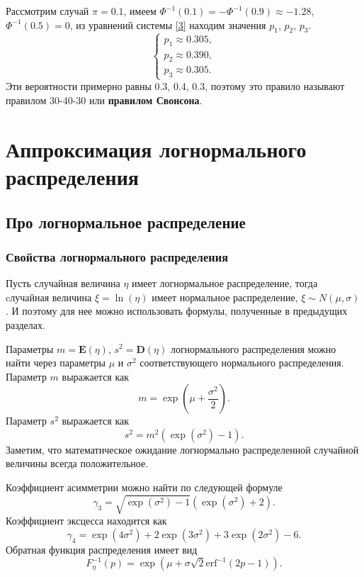 \documentclass[specialist, substylefile = spbu.rtx,
subf,href,colorlinks=true, 12pt]{disser}
\begin{document}
Рассмотрим случай $\pi = 0.1$, имеем $\Phi ^{-1}(0.1) = -\Phi ^{-1}(0.9) \approx  -1.28$, $\Phi ^{-1}(0.5) = 0$, из уравнений системы \eqref{3} находим значения $p_{1}$, $p_{2}$, $p_{3}$.
\begin{equation*}
	\begin{cases}
		p_{1}\approx 0.305, \\ 
		p_{2}\approx 0.390,  \\ 
		p_{3}\approx 0.305.
	\end{cases}
\end{equation*}
Эти вероятности примерно равны 0.3, 0.4, 0.3, поэтому это правило называют правилом 30-40-30 или \textbf{правилом Свонсона}.
	
	\chapter{Аппроксимация логнормального распределения}

	\section{Про логнормальное распределение}
	\subsection{Свойства логнормального распределения}  
	
	Пусть случайная величина $\eta$ имеет логнормальное распределение, тогда cлучайная величина $\xi = \ln(\eta)$ имеет нормальное распределение, $\xi \sim N(\mu, \sigma)$. И поэтому для нее можно использовать формулы, полученные в предыдущих разделах.
	
	Параметры $m = \mathbf E(\eta)$, $s^{2} = \mathbf D(\eta)$ логнормального распределения можно найти через параметры $\mu$ и $\sigma^{2}$ соответствующего нормального распределения. Параметр $m$ выражается как 
	\begin{equation}
		m = \exp\left( \mu+\frac{\sigma ^{2}}{2}\right). \label{6}
	\end{equation}
	Параметр $s^{2}$ выражается как 
	\begin{equation}
		s^{2} = m^{2}(\exp(\sigma^{2})-1). \label{7}
	\end{equation}
	Заметим, что математическое ожидание логнормально распределенной случайной величины всегда положительное.
	
	Коэффициент асимметрии можно найти \cite{Discretization} по следующей формуле
	\begin{equation}
		\gamma_{3} = \sqrt{\exp(\sigma^{2})-1}(\exp(\sigma^{2})+2). \label{8}
	\end{equation}
	Коэффициент эксцесса находится \cite{Discretization} как
	\begin{equation}
		\gamma_{4} = \exp(4\sigma^{2})+2\exp(3\sigma^{2})+3\exp(2\sigma^{2})-6. \label{9}
	\end{equation}
	Обратная функция распределения имеет вид
	\begin{equation}
		F_{\eta}^{-1}(p) = \exp(\mu+\sigma\sqrt{2}\mathrm{erf}^{-1}(2p-1)). \label{10}
	\end{equation}
	
\end{document}
